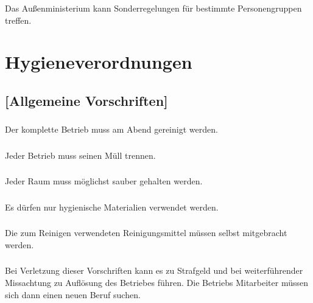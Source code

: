 \documentclass[a4paper, 11pt]{report}
\let\oldsubsection\subsection
\renewcommand{\subsection}{\leftskip=40pt\oldsubsection}
\begin{document}
\subsubsection{}
Das Außenministerium kann Sonderregelungen für bestimmte Personengruppen treffen. 
    
    
\section{Hygieneverordnungen}

\subsection{[Allgemeine Vorschriften]}

 
\subsubsection{}
Der komplette Betrieb muss am Abend gereinigt werden. 

\subsubsection{}
Jeder Betrieb muss seinen Müll trennen. 

\subsubsection{}
Jeder Raum muss möglichst sauber gehalten werden. 

\subsubsection{}
Es dürfen nur hygienische Materialien verwendet werden. 

\subsubsection{}
Die zum Reinigen verwendeten Reinigungsmittel müssen selbst mitgebracht werden. 

\subsubsection{}
Bei Verletzung dieser Vorschriften kann es zu Strafgeld und bei weiterführender Missachtung zu Auflösung des Betriebes führen. Die Betriebs Mitarbeiter müssen sich dann einen neuen Beruf suchen. 

 
\end{document}
